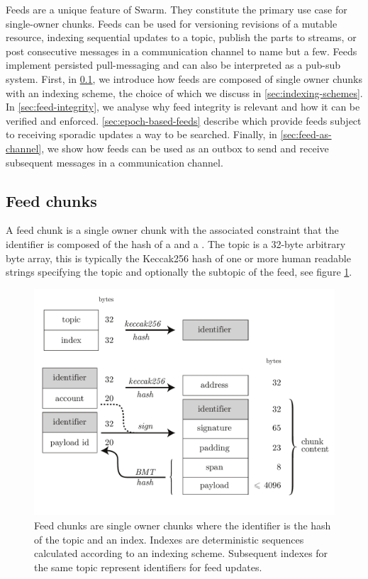 \green{}

Feeds are a unique feature of Swarm. They constitute the primary use case for single-owner chunks. Feeds can be used for versioning revisions of a mutable resource, indexing sequential updates to a topic, publish the parts to streams, or post consecutive messages in a communication channel to name but a few. Feeds implement persisted pull-messaging and can also be interpreted as a pub-sub system.
First, in \ref{sec:feed-chunks}, we introduce how feeds are composed of single owner chunks with an indexing scheme, the choice of which we discuss in \ref{sec:indexing-schemes}. In \ref{sec:feed-integrity}, we analyse why feed integrity is relevant and how it can be verified and enforced. \ref{sec:epoch-based-feeds} describe  which provide feeds subject to receiving sporadic updates a way to be searched. Finally, in \ref{sec:feed-as-channel}, we show how feeds can be used as an outbox to send and receive subsequent messages in a communication channel.


\subsection{Feed chunks \statusyellow}\label{sec:feed-chunks}

A feed chunk is a single owner chunk with the associated constraint that the identifier is composed of the hash of a  and a . The topic is a 32-byte arbitrary byte array, this is typically the Keccak256 hash of one or more human readable strings specifying the topic and optionally the subtopic of the feed, see figure \ref{fig:feed-chunk}. 


\begin{figure}[htbp]
\centering
\includegraphics[width=\textwidth]{fig/feed-chunk.pdf}
\caption[Feed chunk \statusgreen]{Feed chunks are single owner chunks where the identifier is the hash of the topic and an index. Indexes are deterministic sequences calculated according to an indexing scheme. Subsequent indexes for the same topic represent identifiers for feed updates.}
\label{fig:feed-chunk}
\end{figure}

